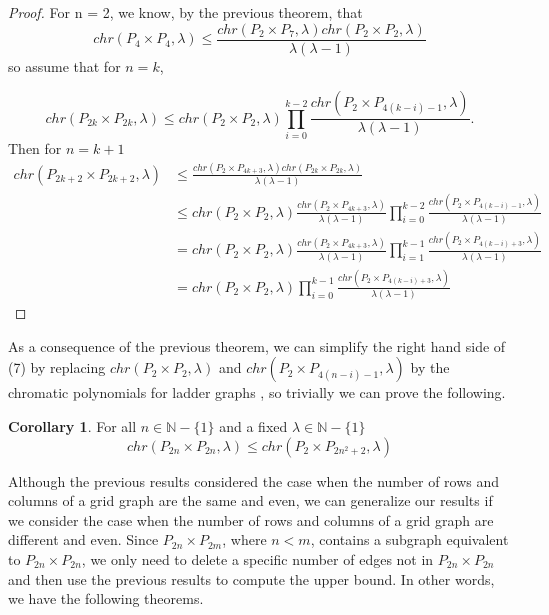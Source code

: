 \documentclass[11pt]{article}
\theoremstyle{definition}
\newcommand{\N}{{\mathbb{N}}}
\newtheorem{cor}{Corollary}
\begin{document}
\begin{proof}
For n = 2, we know, by the previous theorem, that 
\begin{equation}
chr(P_{4} \times P_{4}, \lambda) \leq \frac{chr(P_{2} \times P_{7}, \lambda)chr(P_{2} \times P_{2}, \lambda)}{\lambda(\lambda - 1)} \nonumber
\end{equation} so assume that for $n = k$,

\begin{equation}
chr(P_{2k} \times P_{2k}, \lambda) \leq chr(P_{2} \times P_{2},\lambda)\prod_{i = 0}^{k - 2} \frac{chr(P_{2} \times P_{4(k - i) - 1},\lambda)}{\lambda(\lambda - 1)}. \nonumber
\end{equation} Then for $n = k + 1$
\begin{align*}
chr(P_{2k + 2} \times P_{2k + 2},\lambda) &\leq \frac{chr(P_{2} \times P_{4k + 3},\lambda)chr(P_{2k} \times P_{2k},\lambda)}{\lambda(\lambda - 1)} 
\nonumber \\
&\leq chr(P_{2} \times P_{2},\lambda) \frac{chr(P_{2} \times P_{4k + 3},\lambda)}{\lambda(\lambda - 1)}\prod_{i = 0}^{k - 2} \frac{chr(P_{2} \times P_{4(k - i) - 1},\lambda)}{\lambda(\lambda - 1)} \nonumber \\
&= chr(P_{2} \times P_{2},\lambda)\frac{chr(P_{2} \times P_{4k + 3},\lambda)}{\lambda(\lambda - 1)}\prod_{i = 1}^{k - 1} \frac{chr(P_{2} \times P_{4(k - i) + 3},\lambda)}{\lambda(\lambda - 1)}  \\
&= chr(P_{2} \times P_{2},\lambda)\prod_{i = 0}^{k - 1} \frac{chr(P_{2} \times P_{4(k - i) + 3},\lambda)}{\lambda(\lambda - 1)}
\end{align*}

\end{proof}

As a consequence of the previous theorem, we can simplify the right hand side of (7) by replacing $chr(P_2 \times P_2,\lambda)$ and $chr(P_2 \times P_{4(n - i) - 1},\lambda)$ by the chromatic polynomials for ladder graphs \cite{Weiss}, so trivially we can prove the following.

\begin{cor}
For all $n \in \N - \{1\}$ and a fixed $\lambda \in \N - \{1\}$
\begin{equation}
chr(P_{2n} \times P_{2n}, \lambda) \leq chr(P_{2} \times P_{2n^2 + 2}, \lambda)
\end{equation}

\end{cor}

Although the previous results considered the case when the number of rows and columns of a grid graph are the same and even, we can generalize our results if we consider the case when the number of rows and columns of a grid graph are different and even. Since $P_{2n} \times P_{2m}$, where $n < m$, contains a subgraph equivalent to $P_{2n} \times P_{2n}$, we only need to delete a specific number of edges not in $P_{2n} \times P_{2n}$ and then use the previous results to compute the upper bound. In other words, we have the following theorems.
\end{document}
